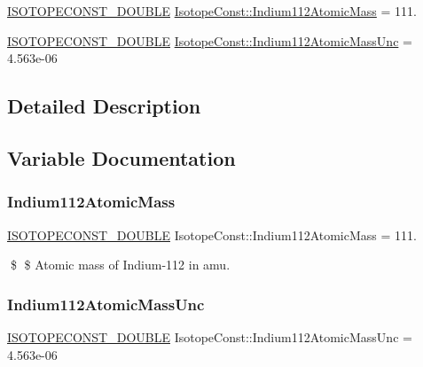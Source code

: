 \begin{DoxyCompactItemize}
\item 
\mbox{\hyperlink{group___isotope_const-_macros_ga8f45a7272ce02c0b4c65c44636ed719a}{I\+S\+O\+T\+O\+P\+E\+C\+O\+N\+S\+T\+\_\+\+D\+O\+U\+B\+LE}} \mbox{\hyperlink{group___isotope_const-_indium-_in112_ga1ccba1aab3547e94307508300967061c}{Isotope\+Const\+::\+Indium112\+Atomic\+Mass}} = 111.
\item 
\mbox{\hyperlink{group___isotope_const-_macros_ga8f45a7272ce02c0b4c65c44636ed719a}{I\+S\+O\+T\+O\+P\+E\+C\+O\+N\+S\+T\+\_\+\+D\+O\+U\+B\+LE}} \mbox{\hyperlink{group___isotope_const-_indium-_in112_ga2226599d27d8512d28d9ebebceee51e7}{Isotope\+Const\+::\+Indium112\+Atomic\+Mass\+Unc}} = 4.\+563e-\/06
\end{DoxyCompactItemize}


\subsection{Detailed Description}


\subsection{Variable Documentation}
\mbox{\label{group___isotope_const-_indium-_in112_ga1ccba1aab3547e94307508300967061c}} 
\subsubsection{\texorpdfstring{Indium112\+Atomic\+Mass}{Indium112AtomicMass}}
{\footnotesize\ttfamily \mbox{\hyperlink{group___isotope_const-_macros_ga8f45a7272ce02c0b4c65c44636ed719a}{I\+S\+O\+T\+O\+P\+E\+C\+O\+N\+S\+T\+\_\+\+D\+O\+U\+B\+LE}} Isotope\+Const\+::\+Indium112\+Atomic\+Mass = 111.}

\$ \$ Atomic mass of Indium-\/112 in amu. \mbox{\label{group___isotope_const-_indium-_in112_ga2226599d27d8512d28d9ebebceee51e7}} 
\subsubsection{\texorpdfstring{Indium112\+Atomic\+Mass\+Unc}{Indium112AtomicMassUnc}}
{\footnotesize\ttfamily \mbox{\hyperlink{group___isotope_const-_macros_ga8f45a7272ce02c0b4c65c44636ed719a}{I\+S\+O\+T\+O\+P\+E\+C\+O\+N\+S\+T\+\_\+\+D\+O\+U\+B\+LE}} Isotope\+Const\+::\+Indium112\+Atomic\+Mass\+Unc = 4.\+563e-\/06}

